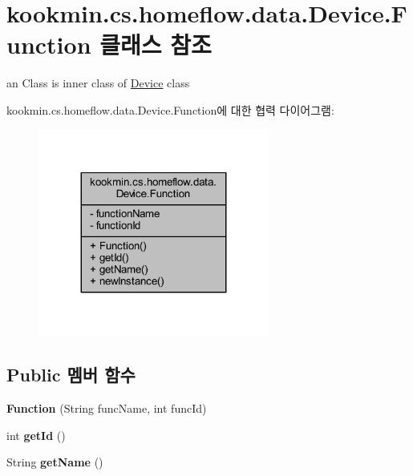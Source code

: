 \hypertarget{classkookmin_1_1cs_1_1homeflow_1_1data_1_1_device_1_1_function}{}\section{kookmin.\+cs.\+homeflow.\+data.\+Device.\+Function 클래스 참조}
\label{classkookmin_1_1cs_1_1homeflow_1_1data_1_1_device_1_1_function}


an Class is inner class of \hyperlink{classkookmin_1_1cs_1_1homeflow_1_1data_1_1_device}{Device} class  




kookmin.\+cs.\+homeflow.\+data.\+Device.\+Function에 대한 협력 다이어그램\+:
\nopagebreak
\begin{figure}[H]
\begin{center}
\leavevmode
\includegraphics[width=215pt]{classkookmin_1_1cs_1_1homeflow_1_1data_1_1_device_1_1_function__coll__graph}
\end{center}
\end{figure}
\subsection*{Public 멤버 함수}
\begin{DoxyCompactItemize}
\item 
\hypertarget{classkookmin_1_1cs_1_1homeflow_1_1data_1_1_device_1_1_function_ae4fe76146719f7d0ff2f5b610b49eca3}{}{\bfseries Function} (String func\+Name, int func\+Id)\label{classkookmin_1_1cs_1_1homeflow_1_1data_1_1_device_1_1_function_ae4fe76146719f7d0ff2f5b610b49eca3}

\item 
\hypertarget{classkookmin_1_1cs_1_1homeflow_1_1data_1_1_device_1_1_function_ad824c47111de83b319140b7ee85209bd}{}int {\bfseries get\+Id} ()\label{classkookmin_1_1cs_1_1homeflow_1_1data_1_1_device_1_1_function_ad824c47111de83b319140b7ee85209bd}

\item 
\hypertarget{classkookmin_1_1cs_1_1homeflow_1_1data_1_1_device_1_1_function_a7b41f1357734eb854ac3500a596d4795}{}String {\bfseries get\+Name} ()\label{classkookmin_1_1cs_1_1homeflow_1_1data_1_1_device_1_1_function_a7b41f1357734eb854ac3500a596d4795}

\end{DoxyCompactItemize}
